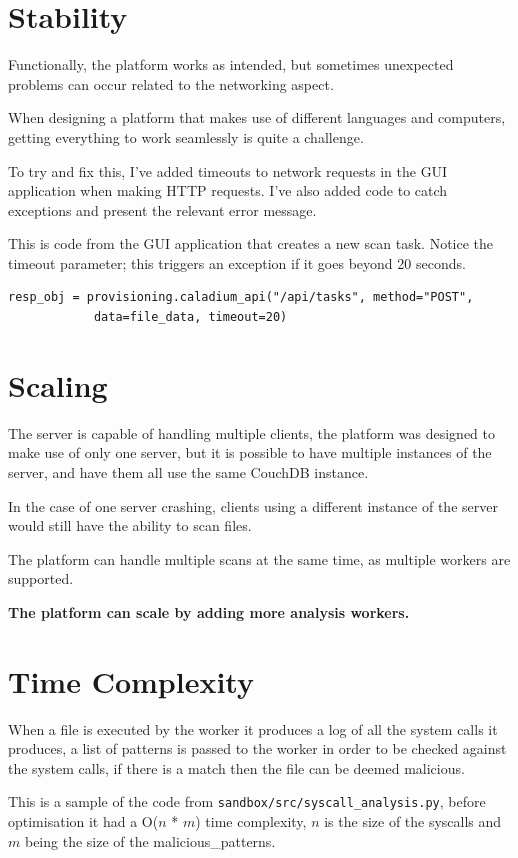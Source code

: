\section{Stability}
Functionally, the platform works as intended,
but sometimes unexpected problems can occur
related to the networking aspect.

When designing a platform that makes use of
different languages and computers, getting everything
to work seamlessly is quite a challenge.

To try and fix this, I've added timeouts
to network requests in the GUI application when making HTTP requests.
I've also added code to catch exceptions
and present the relevant error message.

This is code from the GUI application that creates a new scan task.
Notice the timeout parameter;
this triggers an exception if it goes beyond 20 seconds.

\begin{lstlisting}
resp_obj = provisioning.caladium_api("/api/tasks", method="POST",
            data=file_data, timeout=20)
\end{lstlisting}

\section{Scaling}
The server is capable of handling multiple clients,
the platform was designed to make use of only one server,
but it is possible to have multiple instances of the server,
and have them all use the same CouchDB instance.

In the case of one server crashing,
clients using a different instance of the server
would still have the ability to scan files.

The platform can handle multiple scans at the same time,
as multiple workers are supported.

\textbf{The platform can scale by adding more analysis workers.}

\section{Time Complexity}
When a file is executed by the worker it produces a log of all the
system calls it produces, a list of patterns is passed to
the worker in order to be checked against the system calls,
if there is a match then the file can be deemed malicious.

This is a sample of the code from \texttt{sandbox/src/syscall\_analysis.py},
before optimisation it had a O($n$ * $m$) time complexity,
$n$ is the size of the syscalls
and $m$ being the size of the malicious\_patterns.

